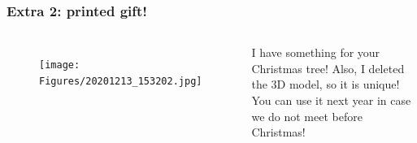 \documentclass[aspectratio=169]{beamer}\usepackage[utf8]{inputenc}
\begin{document}
\begin{frame}\frametitle{Extra 2: printed gift!}

\begin{columns}[c]

\begin{figure}[ht!]
\centering
\texttt{[image: Figures/20201213\_153202.jpg]}
\end{figure}

I have something for your Christmas tree! Also, I deleted the 3D model, so it is unique! You can use it next year in case we do not meet before Christmas!

\end{columns}

\end{frame}


%
%
%
%
%
\end{document}
